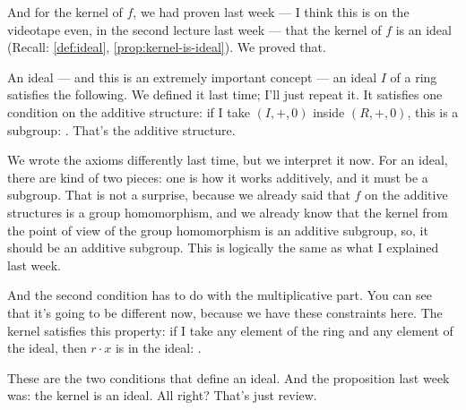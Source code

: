 \begin{speech}[00:32:57 - 00:35:06]
And for the kernel of $f$, we had proven last week --- I think this is on the videotape even, in the second lecture last week --- that the kernel of $f$ is an ideal (Recall: \cref{def:ideal}, \cref{prop:kernel-is-ideal}).  We proved that.

An ideal --- and this is an extremely important concept ---  an ideal $I$ of a ring satisfies the following. We defined it last time; I'll just repeat it. It satisfies one condition on the additive structure: if I take $(I, +, 0)$ inside $(R, +, 0)$, this is a subgroup: . That's the additive structure.

We wrote the axioms differently last time, but we interpret it now. For an ideal, there are kind of two pieces: one is how it works additively, and it must be a subgroup. That is not a surprise, because we already said that $f$ on the additive structures is a group homomorphism, and we already know that the kernel from the point of view of the group homomorphism is an additive subgroup, so, it should be an additive subgroup. This is logically the same as what I explained last week.

And the second condition has to do with the multiplicative part. You can see that it's going to be different now, because we have these constraints here. The kernel satisfies this property: if I take any element of the ring and any element of the ideal, then $r \cdot x$ is in the ideal: .

These are the two conditions that define an ideal. And the proposition last week was: the kernel is an ideal. All right? That's just review.
\end{speech}

